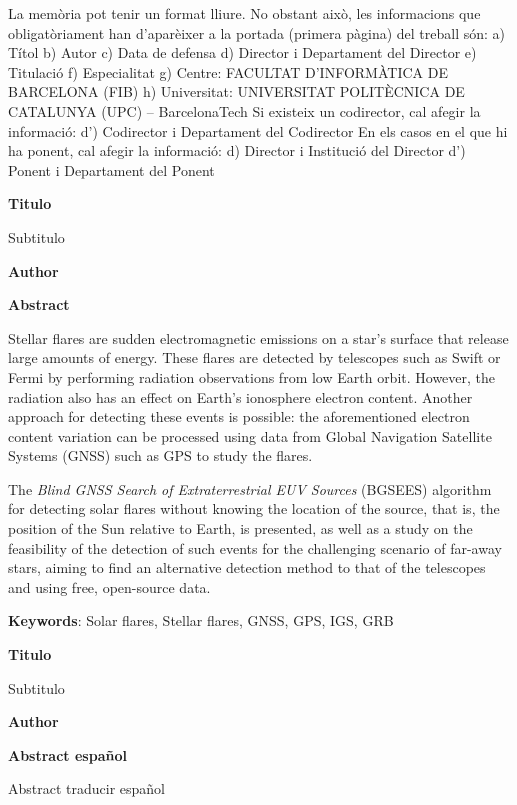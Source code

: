 	La memòria pot tenir un format lliure. No obstant això, les informacions que obligatòriament han
d’aparèixer a la portada (primera pàgina) del treball són:
a) Títol
b) Autor
c) Data de defensa
d) Director i Departament del Director
e) Titulació
f) Especialitat
g) Centre:  FACULTAT D’INFORMÀTICA DE BARCELONA (FIB)
h) Universitat: UNIVERSITAT POLITÈCNICA DE CATALUNYA (UPC) – BarcelonaTech
Si existeix un codirector, cal afegir la informació:
d’) Codirector i Departament del Codirector
En els casos en el que hi ha ponent, cal afegir la informació:
d) Director i Institució del Director
d') Ponent  i Departament del Ponent
\clearpage
\thispagestyle{empty}
\begin{center}
    \Large
    \textbf{Titulo}
 
    \vspace{0.4cm}
    \large
    Subtitulo
 
    \vspace{0.4cm}
    \textbf{Author}
 
    \vspace{0.9cm}
    \textbf{Abstract}
\end{center}
Stellar flares are sudden electromagnetic emissions on a star's surface that release large amounts of energy. These flares are detected by telescopes such as Swift or Fermi by performing radiation observations from low Earth orbit. However, the radiation also has an effect on Earth’s ionosphere electron content. Another approach for detecting these events is possible: the aforementioned electron content variation can be processed using data from Global Navigation Satellite Systems (GNSS) such as GPS to study the flares.

The \textit{Blind GNSS Search of Extraterrestrial EUV Sources} (BGSEES) algorithm for detecting solar flares without knowing the location of the source, that is, the position of the Sun relative to Earth, is presented, as well as a study on the feasibility of the detection of such events for the challenging scenario of far-away stars, aiming to find an alternative detection method to that of the telescopes and using free, open-source data.

\textbf{Keywords}: Solar flares, Stellar flares, GNSS, GPS, IGS, GRB

\clearpage
\thispagestyle{empty}
\begin{center}
	\Large
	\textbf{Titulo}
	
	\vspace{0.4cm}
	\large
	Subtitulo
	
	\vspace{0.4cm}
	\textbf{Author}
	
	\vspace{0.9cm}
	\textbf{Abstract español}
\end{center}
Abstract traducir español

